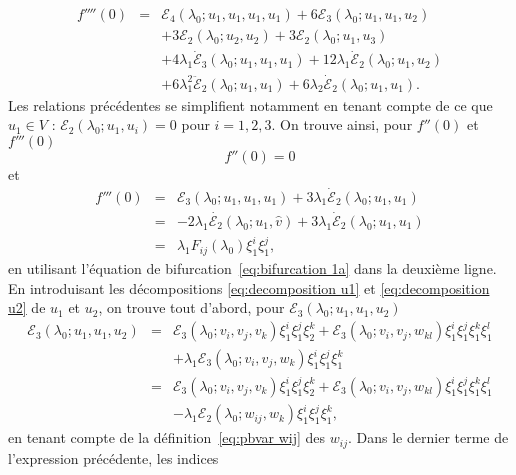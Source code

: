 \documentclass{article}
\begin{document}
\begin{eqnarray}
  f'''' (0) & = & \mathcal{E}_4 (λ_0 ; u_1, u_1, u_1, u_1) +
  6\mathcal{E}_3 (λ_0 ; u_1, u_1, u_2) \nonumber\\
  &  &  + 3\mathcal{E}_2 (λ_0 ; u_2, u_2) + 3\mathcal{E}_2
  (λ_0 ; u_1, u_3) \nonumber\\
  &  &  + 4 λ_1  \dot{\mathcal{E}}_3 (λ_0 ; u_1, u_1,
  u_1) + 12 λ_1  \dot{\mathcal{E}}_2 (λ_0 ; u_1, u_2) \nonumber\\
  &  &  + 6 λ_1^2  \ddot{\mathcal{E}}_2 (λ_0 ; u_1, u_1)
  + 6 λ_2  \dot{\mathcal{E}}_2 (λ_0 ; u_1, u_1) . \nonumber
\end{eqnarray}
Les relations précédentes se simplifient notamment en tenant compte de
ce que $u_1∈V$ : $\mathcal{E}_2 (λ_0 ; u_1, u_i) = 0$ pour $i = 1,
2, 3$. On trouve ainsi, pour $f'' (0)$ et $f''' (0)$
\begin{equation}
  \label{eq:DL energie derivee 2nde} f'' (0) = 0
\end{equation}
et
\begin{eqnarray}
  f''' (0) & = & \mathcal{E}_3 (λ_0 ; u_1, u_1, u_1) + 3 λ_1
  \dot{\mathcal{E}}_2 (λ_0 ; u_1, u_1) \nonumber\\
  & = & - 2 λ_1  \dot{\mathcal{E}_2} (λ_0 ; u_1, \hat{v}) + 3
  λ_1  \dot{\mathcal{E}}_2 (λ_0 ; u_1, u_1) \nonumber\\
  & = & λ_1 F_{i  j} (λ_0) \xi_1^i \xi_1^j,  \label{eq:DL
  energie derivee 3ieme}
\end{eqnarray}
en utilisant l'équation de bifurcation~\eqref{eq:bifurcation 1a} dans la
deuxième ligne. En introduisant les décompositions
\eqref{eq:decomposition u1} et \eqref{eq:decomposition u2} de $u_1$ et $u_2$,
on trouve tout d'abord, pour $\mathcal{E}_3 (λ_0 ; u_1, u_1, u_2)$
\begin{eqnarray*}
  \mathcal{E}_3 (λ_0 ; u_1, u_1, u_2) & = & \mathcal{E}_3 (λ_0 ;
  v_i, v_j, v_k) \xi_1^i \xi_1^j \xi_2^k +\mathcal{E}_3 (λ_0 ; v_i, v_j,
  w_{k  l}) \xi_1^i \xi_1^j \xi_1^k \xi_1^l\\
  &  &  + λ_1 \mathcal{E}_3 (λ_0 ; v_i, v_j, w_k)
  \xi_1^i \xi_1^j \xi_1^k\\
  & = & \mathcal{E}_3 (λ_0 ; v_i, v_j, v_k) \xi_1^i \xi_1^j \xi_2^k
  +\mathcal{E}_3 (λ_0 ; v_i, v_j, w_{k  l}) \xi_1^i \xi_1^j
  \xi_1^k \xi_1^l\\
  &  &  - λ_1 \mathcal{E}_2 (λ_0 ; w_{i  j},
  w_k) \xi_1^i \xi_1^j \xi_1^k,
\end{eqnarray*}
en tenant compte de la définition~\eqref{eq:pbvar wij} des $w_{i
j}$. Dans le dernier terme de l'expression précédente, les indices
\end{document}
